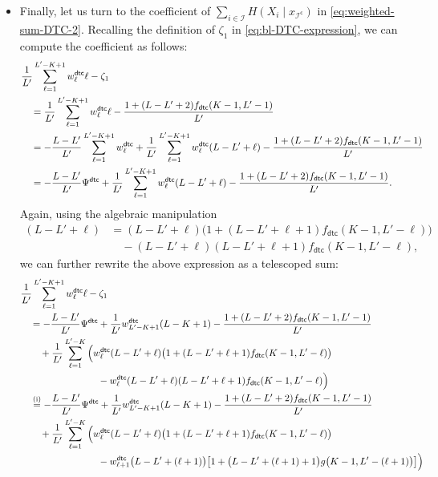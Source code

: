 \documentclass[english]{article}
\newcommand{\cI}{\mathcal{I}}
\newcommand{\dtc}{\mathsf{dtc}}
\begin{document}
\begin{itemize}
\item Finally, let us turn to the coefficient of $ \sum_{i \in \cI} H(X_i \mid x_{\cI^\mathsf{c}}) $ in \eqref{eq:weighted-sum-DTC-2}. Recalling the definition of $\zeta_1$ in \eqref{eq:bl-DTC-expression}, we can compute the coefficient as follows:
\begin{align*}
&\frac1{L'} \sum_{\ell = 1}^{L'-K+1}  w^\dtc_{\ell} \ell - \zeta_{1} \notag\\
&\quad = \frac{1}{L'} \sum_{\ell = 1}^{L'-K+1} w^\dtc_{\ell} \ell  - \frac{1+(L-L'+2)f_\dtc(K-1, L'-1)}{L'} \notag \\
&\quad = -\frac{L-L'}{L'} \sum_{\ell = 1}^{L'-K+1} w^\dtc_{\ell} + \frac{1}{L'} \sum_{\ell = 1}^{L'-K+1} w^\dtc_{\ell} (L-L'+\ell) - \frac{1+(L-L'+2)f_\dtc(K-1, L'-1)}{L'} \\
&\quad = -\frac{L-L'}{L'} \Psi^\dtc + \frac{1}{L'} \sum_{\ell = 1}^{L'-K+1} w^\dtc_{\ell} (L-L'+\ell) - \frac{1+(L-L'+2)f_\dtc(K-1, L'-1)}{L'}.
\end{align*}
Again, using the algebraic manipulation
\begin{align*}
(L-L'+\ell) &= (L-L'+\ell)\big(1 + (L-L'+\ell+1)f_\dtc(K-1, L'-\ell)\big) \\
& \quad - (L-L'+\ell)(L-L'+\ell+1)f_\dtc(K-1, L'-\ell),
\end{align*}
we can further rewrite the above expression as a telescoped sum:
\begin{align}
    &\frac1{L'} \sum_{\ell = 1}^{L'-K+1}  w^\dtc_{\ell} \ell -  \zeta_{1} \notag\\
&\quad = -\frac{L-L'}{L'} \Psi^\dtc +\frac{1}{L'}w^\dtc_{L'-K+1} (L-K+1) - \frac{1+(L-L'+2)f_\dtc(K-1, L'-1)}{L'} \notag\\
& \quad\quad + \frac{1}{L'} \sum_{\ell = 1}^{L'-K} \Big( w^\dtc_{\ell} (L-L'+\ell)\big(1 + (L-L'+\ell+1)f_\dtc(K-1, L'-\ell)\big) \notag \\
&\hspace{8em} - w^\dtc_{\ell} (L-L'+\ell)(L-L'+\ell+1)f_\dtc(K-1, L'-\ell) \Big) \notag \\
&\quad \stackrel{\text{(i)}}{=} -\frac{L-L'}{L'} \Psi^\dtc +\frac{1}{L'}w^\dtc_{L'-K+1} (L-K+1) - \frac{1+(L-L'+2)f_\dtc(K-1, L'-1)}{L'} \notag\\
& \quad\quad + \frac{1}{L'} \sum_{\ell = 1}^{L'-K} \Big( w^\dtc_{\ell} (L-L'+\ell)\big(1 + (L-L'+\ell+1)f_\dtc(K-1, L'-\ell)\big) \notag \\
&\hspace{8em} - w^\dtc_{\ell + 1} \big(L-L'+(\ell + 1)\big)\big[1 + \big(L-L'+(\ell + 1)+1\big)g\big(K-1, L'-(\ell + 1)\big)\big] \Big) \notag \\

\end{align}
\end{itemize}
\end{document}
